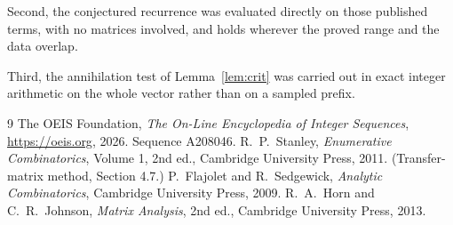 \documentclass[11pt,a4paper]{article}
\theoremstyle{plain}
\theoremstyle{definition}
\begin{document}
Second, the conjectured recurrence was evaluated directly on those published terms, with no
matrices involved, and holds wherever the proved range and the data overlap.

Third, the annihilation test of Lemma~\ref{lem:crit} was carried out in exact integer
arithmetic on the whole vector rather than on a sampled prefix.

\begin{thebibliography}{9}
 The OEIS Foundation, \emph{The On-Line Encyclopedia of Integer
Sequences}, \url{https://oeis.org}, 2026. Sequence A208046.
 R.~P.~Stanley, \emph{Enumerative Combinatorics}, Volume 1, 2nd ed.,
Cambridge University Press, 2011. (Transfer-matrix method, Section 4.7.)
 P.~Flajolet and R.~Sedgewick, \emph{Analytic Combinatorics}, Cambridge
University Press, 2009.
 R.~A.~Horn and C.~R.~Johnson, \emph{Matrix Analysis}, 2nd ed., Cambridge
University Press, 2013.
\end{thebibliography}
\end{document}
